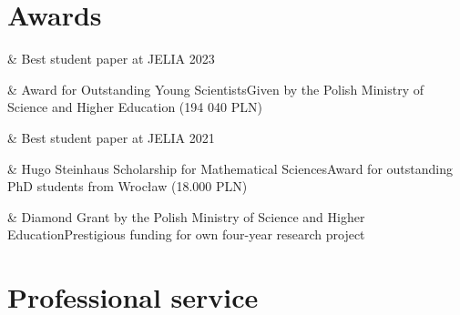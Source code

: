 \documentclass[10pt,a4paper]{article}
\begin{document}



\section{Awards}

\begin{EntriesTableDuration}
    &
  Best student paper at JELIA 2023\\
\end{EntriesTableDuration}

\begin{EntriesTableDuration}
    &
  Award for Outstanding Young Scientists\newline Given by the Polish Ministry of Science and Higher Education (194 040 PLN)\\
\end{EntriesTableDuration}

\begin{EntriesTableDuration}
    &
  Best student paper at JELIA 2021\\
\end{EntriesTableDuration}

\begin{EntriesTableDuration}
    &
  Hugo Steinhaus Scholarship for Mathematical Sciences\newline Award for outstanding PhD students from Wrocław (18.000 PLN)\\
\end{EntriesTableDuration}

\begin{EntriesTableDuration}
    &
  Diamond Grant by the Polish Ministry of Science and Higher Education\newline Prestigious funding for own four-year research project\\
\end{EntriesTableDuration}


\section{Professional service}
\end{document}
